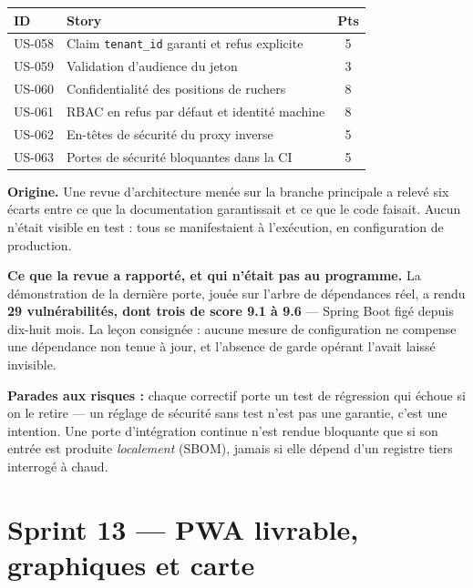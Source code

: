 \begin{center}
\begin{tabular}{lp{9cm}c}
\toprule
\textbf{ID} & \textbf{Story} & \textbf{Pts} \\
\midrule
US-058 & Claim \texttt{tenant\_id} garanti et refus explicite & 5 \\
US-059 & Validation d'audience du jeton                       & 3 \\
US-060 & Confidentialité des positions de ruchers             & 8 \\
US-061 & RBAC en refus par défaut et identité machine         & 8 \\
US-062 & En-têtes de sécurité du proxy inverse                & 5 \\
US-063 & Portes de sécurité bloquantes dans la CI             & 5 \\
\bottomrule
\end{tabular}
\end{center}

\textbf{Origine.} Une revue d'architecture menée sur la branche principale a
relevé six écarts entre ce que la documentation garantissait et ce que le code
faisait. Aucun n'était visible en test : tous se manifestaient à l'exécution, en
configuration de production.

\textbf{Ce que la revue a rapporté, et qui n'était pas au programme.} La
démonstration de la dernière porte, jouée sur l'arbre de dépendances réel, a
rendu \textbf{29 vulnérabilités, dont trois de score 9.1 à 9.6} --- Spring Boot
figé depuis dix-huit mois. La leçon consignée : aucune mesure de configuration
ne compense une dépendance non tenue à jour, et l'absence de garde opérant
l'avait laissé invisible.

\textbf{Parades aux risques :} chaque correctif porte un test de régression qui
échoue si on le retire --- un réglage de sécurité sans test n'est pas une
garantie, c'est une intention. Une porte d'intégration continue n'est rendue
bloquante que si son entrée est produite \emph{localement} (SBOM), jamais si
elle dépend d'un registre tiers interrogé à chaud.

\section{Sprint 13 --- PWA livrable, graphiques et carte}

